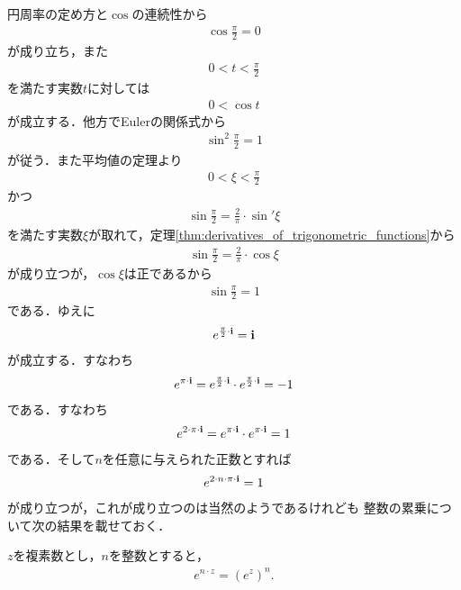 	円周率の定め方と$\cos$の連続性から
	\begin{align}
		\cos{\frac{\pi}{2}} = 0
	\end{align}
	が成り立ち，また
	\begin{align}
		0 < t < \frac{\pi}{2}
	\end{align}
	を満たす実数$t$に対しては
	\begin{align}
		0 < \cos{t}
	\end{align}
	が成立する．他方でEulerの関係式から
	\begin{align}
		\sin^2{\frac{\pi}{2}} = 1
	\end{align}
	が従う．また平均値の定理より
	\begin{align}
		0 < \xi < \frac{\pi}{2}
	\end{align}
	かつ
	\begin{align}
		\sin{\frac{\pi}{2}}
		= \frac{2}{\pi} \cdot \sin'{\xi}
	\end{align}
	を満たす実数$\xi$が取れて，定理\ref{thm:derivatives_of_trigonometric_functions}から
	\begin{align}
		\sin{\frac{\pi}{2}}
		= \frac{2}{\pi} \cdot \cos{\xi}
	\end{align}
	が成り立つが，$\cos{\xi}$は正であるから
	\begin{align}
		\sin{\frac{\pi}{2}} = 1
	\end{align}
	である．ゆえに
	\begin{align}
		e^{\frac{\pi}{2} \cdot \mathbf{i}} = \mathbf{i}
	\end{align}
	が成立する．すなわち
	\begin{align}
		e^{\pi \cdot \mathbf{i}}
		= e^{\frac{\pi}{2} \cdot \mathbf{i}} \cdot e^{\frac{\pi}{2} \cdot \mathbf{i}}
		= -1
	\end{align}
	である．すなわち
	\begin{align}
		e^{2 \cdot \pi \cdot \mathbf{i}}
		= e^{\pi \cdot \mathbf{i}} \cdot e^{\pi \cdot \mathbf{i}}
		= 1
	\end{align}
	である．そして$n$を任意に与えられた正数とすれば
	\begin{align}
		e^{2 \cdot n \cdot \pi \cdot \mathbf{i}} = 1
	\end{align}
	が成り立つが，これが成り立つのは当然のようであるけれども
	整数の累乗について次の結果を載せておく．
	
	\begin{screen}
		\begin{thm}[指数関数の整数乗]
			$z$を複素数とし，$n$を整数とすると，
			\begin{align}
				e^{n \cdot z} = (e^z)^n.
			\end{align}
		\end{thm}
	\end{screen}
	
